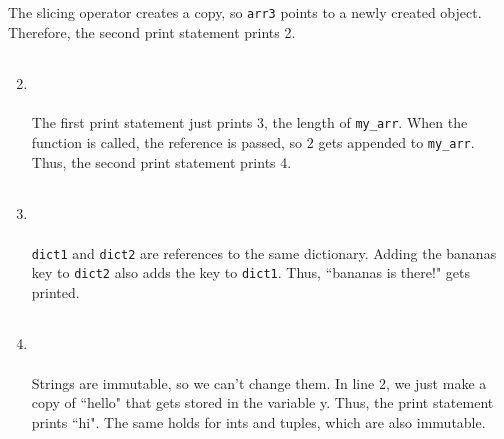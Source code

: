 \documentclass{article}
\newcounter{points}
\newcommand\printpoints{Total number of points: \thepoints}
\begin{document}
\begin{enumerate}
\begin{enumerate}
The slicing operator creates a copy, so \texttt{arr3} points to a newly created object.  Therefore, the second print statement prints 2.
\end{enumerate}

\vspace{0.05in}

\begin{enumerate}
\setcounter{enumii}{1}
\item
\begin{tabular}{c}

\end{tabular} \\ \\
The first print statement just prints 3, the length of \texttt{my\_arr}.  When the function is called, the reference is passed, so $2$ gets appended to \texttt{my\_arr}.  Thus, the second print statement prints 4.
\end{enumerate}

\vspace{0.05in}

\begin{enumerate}
\setcounter{enumii}{2}
\item
\begin{tabular}{c}

\end{tabular} \\ \\
\texttt{dict1} and \texttt{dict2} are references to the same dictionary.  Adding the bananas key to \texttt{dict2} also adds the key to \texttt{dict1}.  Thus, ``bananas is there!" gets printed.
\end{enumerate}

\vspace{0.05in}

\begin{enumerate}
\setcounter{enumii}{3}
\item
\begin{tabular}{c}

\end{tabular} \\ \\
Strings are immutable, so we can't change them.  In line 2, we just make a copy of ``hello" that gets stored in the variable y.  Thus, the print statement prints ``hi".  The same holds for ints and tuples, which are also immutable.
\end{enumerate}




\end{enumerate}
\end{document}
